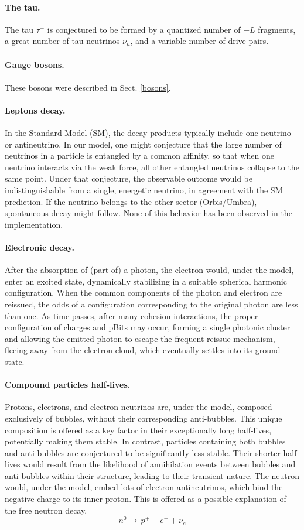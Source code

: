 \documentclass{ijuc}
\begin{document}
\paragraph{The tau.}
The tau $\tau^-$ is conjectured to be formed by a quantized number of $-L$ fragments, a great number of tau neutrinos $\nu_{\mu}$, and a variable number of drive pairs.
\paragraph{Gauge bosons.}
These bosons were described in Sect. \ref{bosons}.
\paragraph{Leptons decay.}
In the Standard Model (SM), the decay products typically include one neutrino or antineutrino.
In our model, one might conjecture that the large number of neutrinos in a particle is entangled by a common affinity, so that when one neutrino interacts via the weak force, all other entangled neutrinos collapse to the same point.
Under that conjecture, the observable outcome would be indistinguishable from a single, energetic neutrino, in agreement with the SM prediction.
If the neutrino belongs to the other sector (Orbis/Umbra), spontaneous decay might follow.  None of this behavior has been observed in the implementation.
\paragraph{Electronic decay.}
After the absorption of (part of) a photon, the electron would, under the model, enter an excited state, dynamically stabilizing in a suitable spherical harmonic configuration.
When the common components of the photon and electron are reissued, the odds of a configuration corresponding to the original photon are less than one.
As time passes, after many cohesion interactions, the proper configuration of charges and pBits may occur, forming a single photonic cluster and allowing the emitted photon to escape the frequent reissue mechanism, fleeing away from the electron cloud, which eventually settles into its ground state.
\paragraph{Compound particles half-lives.}
Protons, electrons, and electron neutrinos are, under the model, composed exclusively of bubbles, without their corresponding anti-bubbles.
This unique composition is offered as a key factor in their exceptionally long half-lives, potentially making them stable.
In contrast, particles containing both bubbles and anti-bubbles are conjectured to be significantly less stable.
Their shorter half-lives would result from the likelihood of annihilation events between bubbles and anti-bubbles within their structure, leading to their transient nature.
The neutron would, under the model, embed lots of electron antineutrinos, which bind the negative charge to its inner proton.
This is offered as a possible explanation of the free neutron decay.
\[
n^0\rightarrow\,p^{+}+e^{-}+\nu_e
\]
\end{document}
